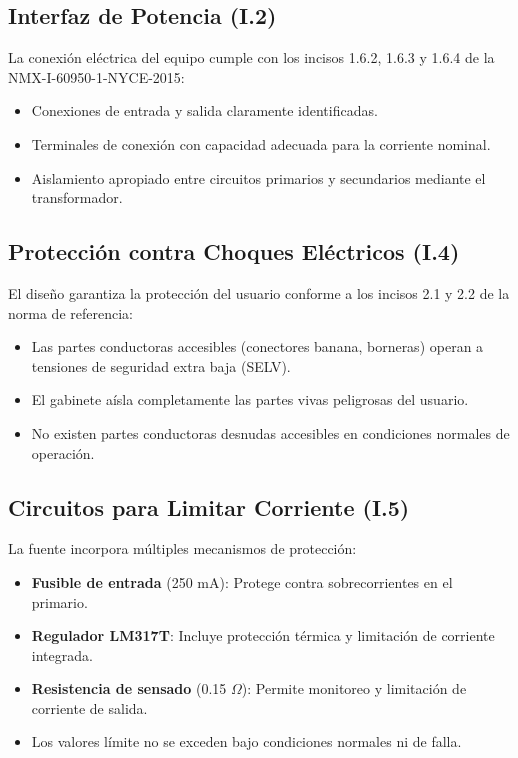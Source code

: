 \documentclass[pdflatex,sn-mathphys-num]{sn-jnl}%
\begin{document}
\subsection{Interfaz de Potencia (I.2)}

La conexión eléctrica del equipo cumple con los incisos 1.6.2, 1.6.3 y 1.6.4 de la NMX-I-60950-1-NYCE-2015:
\begin{itemize}
    \item Conexiones de entrada y salida claramente identificadas.
    \item Terminales de conexión con capacidad adecuada para la corriente nominal.
    \item Aislamiento apropiado entre circuitos primarios y secundarios mediante el transformador.
\end{itemize}

\subsection{Protección contra Choques Eléctricos (I.4)}

El diseño garantiza la protección del usuario conforme a los incisos 2.1 y 2.2 de la norma de referencia:
\begin{itemize}
    \item Las partes conductoras accesibles (conectores banana, borneras) operan a tensiones de seguridad extra baja (SELV).
    \item El gabinete aísla completamente las partes vivas peligrosas del usuario.
    \item No existen partes conductoras desnudas accesibles en condiciones normales de operación.
\end{itemize}

\subsection{Circuitos para Limitar Corriente (I.5)}

La fuente incorpora múltiples mecanismos de protección:
\begin{itemize}
    \item \textbf{Fusible de entrada} (250 mA): Protege contra sobrecorrientes en el primario.
    \item \textbf{Regulador LM317T}: Incluye protección térmica y limitación de corriente integrada.
    \item \textbf{Resistencia de sensado} (0.15 $\Omega$): Permite monitoreo y limitación de corriente de salida.
    \item Los valores límite no se exceden bajo condiciones normales ni de falla.
\end{itemize}
\end{document}
